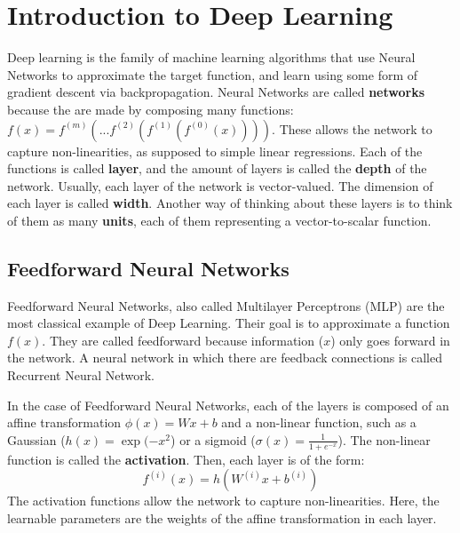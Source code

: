 
\chapter{Introduction to Deep Learning} %

\label{Chapter3} %

Deep learning is the family of machine learning algorithms that use Neural Networks to approximate the target function, and learn using some form of gradient descent via backpropagation.  Neural Networks are called \textbf{networks} because the are made by composing many functions: \(f(x) = f^{(m)}(...f^{(2)}(f^{(1)}(f^{(0)}(x))))\). These allows the network to capture non-linearities, as supposed to simple linear regressions. Each of the functions is called \textbf{layer}, and the amount of layers is called the \textbf{depth} of the network. Usually, each layer of the network is vector-valued. The dimension of each layer is called \textbf{width}. Another way of thinking about these layers is to think of them as many \textbf{units}, each of them representing a vector-to-scalar function.

\section{Feedforward Neural Networks}

Feedforward Neural Networks, also called Multilayer Perceptrons (MLP) are the most classical example of Deep Learning. Their goal is to approximate a function \(f(x)\). They are called feedforward because information (\(x\)) only goes forward in the network. A neural network in which there are feedback connections is called Recurrent Neural Network. 


In the case of Feedforward Neural Networks, each of the layers is composed of an affine transformation \(\phi(x) = Wx + b\) and a non-linear function, such as a Gaussian (\(h(x) = \exp(-x^{2}\)) or a sigmoid (\(\sigma(x) = \frac{1}{1+e^{-x}}\)). The non-linear function is called the \textbf{activation}. Then, each layer is of the form: 
\begin{equation}
f^{(i)}(x) = h\left(W^{(i)}x + b^{(i)}\right)
\end{equation}
The activation functions allow the network to capture non-linearities. Here, the learnable parameters are the weights of the affine transformation in each layer.

